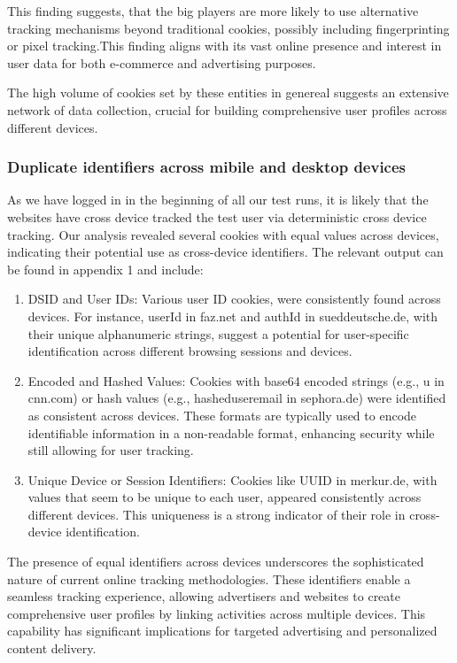 This finding suggests, that the big players are more likely to use alternative tracking mechanisms beyond traditional cookies, possibly including fingerprinting or pixel tracking.This finding aligns with its vast online presence and interest in user data for both e-commerce and advertising purposes.

The high volume of cookies set by these entities in genereal suggests an extensive network of data collection, crucial for building comprehensive user profiles across different devices.


\subsubsection{Duplicate identifiers across mibile and desktop devices}
As we have logged in in the beginning of all our test runs, it is likely that the websites have cross device tracked the test user via deterministic cross device tracking. Our analysis revealed several cookies with equal values across devices, indicating their potential use as cross-device identifiers. The relevant output can be found in appendix 1 and include:
\begin{enumerate}
    \item DSID and User IDs: Various user ID cookies, were consistently found across devices. For instance, userId in faz.net and authId in sueddeutsche.de, with their unique alphanumeric strings, suggest a potential for user-specific identification across different browsing sessions and devices.
    \item Encoded and Hashed Values: Cookies with base64 encoded strings (e.g., u in cnn.com) or hash values (e.g., hasheduseremail in sephora.de) were identified as consistent across devices. These formats are typically used to encode identifiable information in a non-readable format, enhancing security while still allowing for user tracking.
    \item Unique Device or Session Identifiers: Cookies like UUID in merkur.de, with values that seem to be unique to each user, appeared consistently across different devices. This uniqueness is a strong indicator of their role in cross-device identification.
\end{enumerate}
The presence of equal identifiers across devices underscores the sophisticated nature of current online tracking methodologies. These identifiers enable a seamless tracking experience, allowing advertisers and websites to create comprehensive user profiles by linking activities across multiple devices. This capability has significant implications for targeted advertising and personalized content delivery.